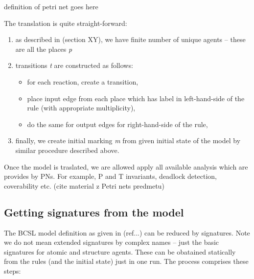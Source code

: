 \documentclass[12pt]{fithesis2}
\begin{document}
definition of petri net goes here

The translation is quite straight-forward: 

\begin{enumerate}
\item as described in (section XY), we have finite number of unique agents -- these are all the places \emph{p}
\item transitions \emph{t} are constructed as follows:
\begin{itemize}
	\item for each reaction, create a transition,
	\item place input edge from each place which has label in left-hand-side of the rule (with appropriate multiplicity),
	\item do the same for output edges for right-hand-side of the rule,
\end{itemize}
\item finally, we create initial marking \emph{m} from given initial state of the model by similar procedure described above.
\end{enumerate}

Once the model is traslated, we are allowed apply all available analysis which are provides by PNs. For example, P and T invariants, deadlock detection, coverability etc. (cite material z Petri nets predmetu)

\subsection{Getting signatures from the model}

The BCSL model definition as given in (ref...) can be reduced by signatures. Note we do not mean extended signatures by complex names -- just the basic signatures for atomic and structure agents. These can be obatained statically from the rules (and the initial state) just in one run. The process comprises these steps:
\end{document}
